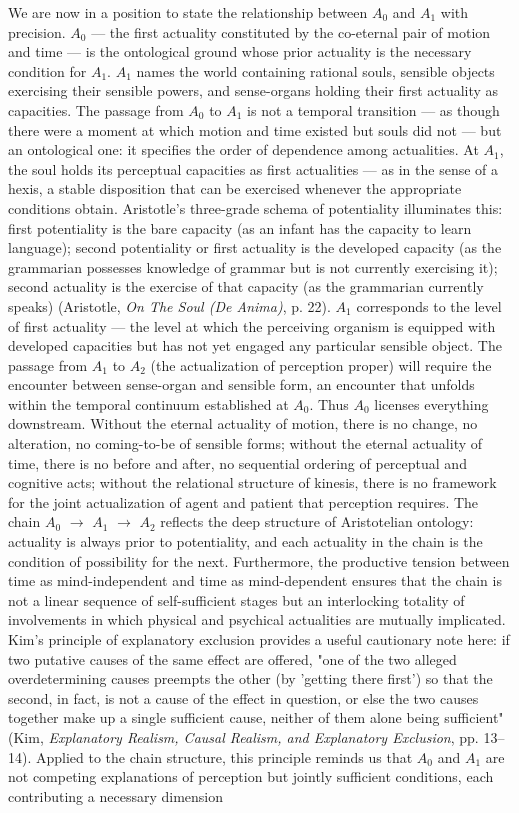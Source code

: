 We are now in a position to state the relationship between $A_0$ and $A_1$ with precision. $A_0$ --- the first actuality constituted by the co-eternal pair of motion and time --- is the ontological ground whose prior actuality is the necessary condition for $A_1$. $A_1$ names the world containing rational souls, sensible objects exercising their sensible powers, and sense-organs holding their first actuality as capacities. The passage from $A_0$ to $A_1$ is not a temporal transition --- as though there were a moment at which motion and time existed but souls did not --- but an ontological one: it specifies the order of dependence among actualities. At $A_1$, the soul holds its perceptual capacities as first actualities --- as  in the sense of a hexis, a stable disposition that can be exercised whenever the appropriate conditions obtain. Aristotle's three-grade schema of potentiality illuminates this: first potentiality is the bare capacity (as an infant has the capacity to learn language); second potentiality or first actuality is the developed capacity (as the grammarian possesses knowledge of grammar but is not currently exercising it); second actuality is the exercise of that capacity (as the grammarian currently speaks) (Aristotle, \textit{On The Soul (De Anima)}, p. 22). $A_1$ corresponds to the level of first actuality --- the level at which the perceiving organism is equipped with developed capacities but has not yet engaged any particular sensible object. The passage from $A_1$ to $A_2$ (the actualization of perception proper) will require the encounter between sense-organ and sensible form, an encounter that unfolds within the temporal continuum established at $A_0$. Thus $A_0$ licenses everything downstream. Without the eternal actuality of motion, there is no change, no alteration, no coming-to-be of sensible forms; without the eternal actuality of time, there is no before and after, no sequential ordering of perceptual and cognitive acts; without the relational structure of kinesis, there is no framework for the joint actualization of agent and patient that perception requires. The chain $A_0$ $\to$ $A_1$ $\to$ $A_2$ reflects the deep structure of Aristotelian ontology: actuality is always prior to potentiality, and each actuality in the chain is the condition of possibility for the next. Furthermore, the productive tension between time as mind-independent and time as mind-dependent ensures that the chain is not a linear sequence of self-sufficient stages but an interlocking totality of involvements in which physical and psychical actualities are mutually implicated. Kim's principle of explanatory exclusion provides a useful cautionary note here: if two putative causes of the same effect are offered, "one of the two alleged overdetermining causes preempts the other (by 'getting there first') so that the second, in fact, is not a cause of the effect in question, or else the two causes together make up a single sufficient cause, neither of them alone being sufficient" (Kim, \textit{Explanatory Realism, Causal Realism, and Explanatory Exclusion}, pp. 13--14). Applied to the chain structure, this principle reminds us that $A_0$ and $A_1$ are not competing explanations of perception but jointly sufficient conditions, each contributing a necessary dimension 